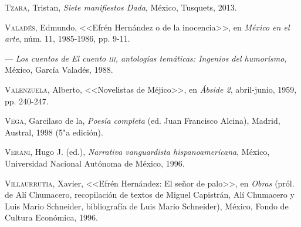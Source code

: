 \documentclass[14pt,twoside,final]{extbook} %
\begin{document}
\textsc{Tzara}, Tristan, \emph{Siete manifiestos Dada}, México, Tusquets, 2013.\label{bib:tzara2013}

\textsc{Valadés}, Edmundo, <<Efrén Hernández o de la inocencia>>, en \emph{México en el arte}, núm. 11, 1985-1986, pp. 9-11.\label{bib:valades1985}

--- \emph{Los cuentos de \emph{El cuento} \textsc{iii}, antologías temáticas: Ingenios del humorismo}, México, García Valadés, 1988.\label{bib:valades1988}

\textsc{Valenzuela}, Alberto, <<Novelistas de Méjico>>, en \emph{Ábside 2}, abril-junio, 1959, pp. 240-247.\label{bib:valenzuela1959}

\textsc{Vega}, Garcilaso de la, \emph{Poesía completa} (ed. Juan Francisco Alcina), Madrid, Austral, 1998 (5"a edición).\label{bib:vega1998}

\textsc{Verani}, Hugo J. (ed.), \emph{Narrativa vanguardista hispanoamericana}, México, Universidad Nacional Autónoma de México, 1996.\label{bib:verani1996}

\textsc{Villaurrutia}, Xavier, <<Efrén Hernández: El señor de palo>>, en \emph{Obras} (pról. de Alí Chumacero, recopilación de textos de Miguel Capistrán, Alí Chumacero y Luis Mario Schneider, bibliografía de Luis Mario Schneider), México, Fondo de Cultura Económica, 1996.\label{bib:villaurrutia1996}
\end{document}
